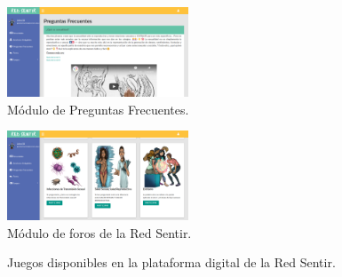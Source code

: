 \documentclass[journal,transmag]{IEEEtran}
\begin{document}
\begin{figure}[tbp]
\centering
\includegraphics[width=0.48\textwidth]{FAQ.png}
\caption{Módulo de Preguntas Frecuentes.}
\label{fig:FAQ}
\end{figure}

\begin{figure}[tbp]
\centering
\includegraphics[width=0.48\textwidth]{foros.png}
\caption{Módulo de foros de la Red Sentir.}
\label{fig:foros}
\end{figure}

\begin{figure}[tbp]
  \centering
	  \hspace{1mm}
  \caption{Juegos disponibles en la plataforma digital de la Red Sentir.}
  \label{fig:juegos}
\end{figure}
\end{document}
